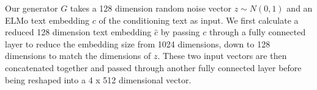 Our generator $G$ takes a 128 dimension random noise vector $z \sim N(0, 1)$ and an ELMo text embedding $c$ of the conditioning text as input. We first calculate a reduced 128 dimension text embedding $\hat{c}$ by passing $c$ through a fully connected layer to reduce the embedding size from 1024 dimensions, down to 128 dimensions to match the dimensions of $z$. These two input vectors are then concatenated together and passed through another fully connected layer before being reshaped into a 4 x 512 dimensional vector.